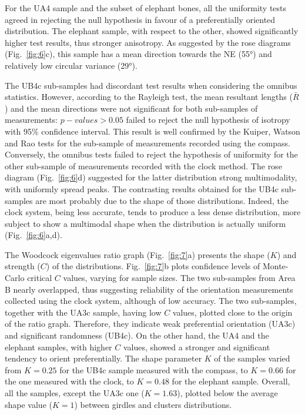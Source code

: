 \documentclass[preprint,authoryear,times]{elsarticle} %
\begin{document}
For the UA4 sample and the subset of elephant bones, all the uniformity tests agreed in rejecting the null hypothesis in favour of a preferentially oriented distribution. The elephant sample, with respect to the other, showed significantly higher test results, thus stronger anisotropy. As suggested by the rose diagrams (Fig.~\ref{fig:6}c), this sample has a mean direction towards the NE (55°) and relatively low circular variance (29°).

The UB4c sub-samples had discordant test results when considering the omnibus statistics. However, according to the Rayleigh test, the mean resultant lengths ($\bar{R}$) and the mean directions were not significant for both sub-samples of measurements: $p-values>0.05$ failed to reject the null hypothesis of isotropy with 95\% confidence interval. This result is well confirmed by the Kuiper, Watson and Rao tests for the sub-sample of measurements recorded using the compass. Conversely, the omnibus tests failed to reject the hypothesis of uniformity for the other sub-sample of measurements recorded with the clock method. The rose diagram (Fig.~\ref{fig:6}d) suggested for the latter distribution strong multimodality, with uniformly spread peaks. The contrasting results obtained for the UB4c sub-samples are most probably due to the shape of those distributions. Indeed, the clock system, being less accurate, tends to produce a less dense distribution, more subject to show a multimodal shape when the distribution is actually uniform (Fig.~\ref{fig:6}a,d).

The Woodcock eigenvalues ratio graph (Fig.~\ref{fig:7}a) presents the shape ($K$) and strength ($C$) of the distributions. Fig.~\ref{fig:7}b plots confidence levels of Monte-Carlo critical $C$ values, varying for sample sizes. The two sub-samples from Area B nearly overlapped, thus suggesting reliability of the orientation measurements collected using the clock system, although of low accuracy. The two sub-samples, together with the UA3c sample, having low $C$ values, plotted close to the origin of the ratio graph. Therefore, they indicate weak preferential orientation (UA3c) and significant randomness (UB4c). On the other hand, the UA4 and the elephant samples, with higher $C$ values, showed a stronger and significant tendency to orient preferentially. The shape parameter $K$ of the samples varied from $K=0.25$ for the UB4c sample measured with the compass, to $K=0.66$ for the one measured with the clock, to $K=0.48$ for the elephant sample. Overall, all the samples, except the UA3c one ($K=1.63$), plotted below the average shape value ($K=1$) between girdles and clusters distributions.
\end{document}

